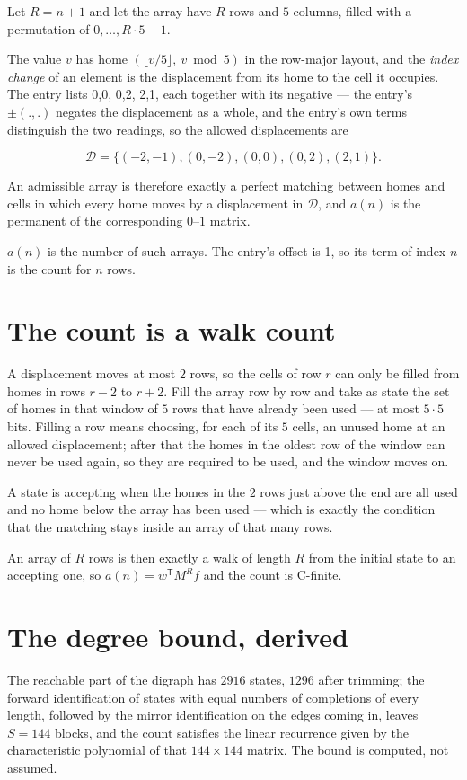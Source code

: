 \documentclass[11pt]{article}
\theoremstyle{definition}
\begin{document}
Let $R = n + 1$ and let the array have $R$ rows and $5$ columns, filled with a permutation of $0,\dots,R\cdot5-1$.

The value $v$ has home $(\lfloor v/5\rfloor,\ v \bmod 5)$ in the row-major layout, and the {\itshape index change} of an element is the displacement from its home to the cell it occupies. The entry lists 0,0, 0,2, 2,1, each together with its negative --- the entry's $\pm(.,.)$ negates the displacement as a whole, and the entry's own terms distinguish the two readings, so the allowed displacements are

\[\mathcal{D} = \{(-2,-1), (0,-2), (0,0), (0,2), (2,1)\}.\]

An admissible array is therefore exactly a perfect matching between homes and cells in which every home moves by a displacement in $\mathcal{D}$, and $a(n)$ is the permanent of the corresponding $0$--$1$ matrix.

$a(n)$ is the number of such arrays. The entry's offset is 1, so its term of index $n$ is the count for $n$ rows.

\section{The count is a walk count}

A displacement moves at most $2$ rows, so the cells of row $r$ can only be filled from homes in rows $r-2$ to $r+2$. Fill the array row by row and take as state the set of homes in that window of $5$ rows that have already been used --- at most $5\cdot5$ bits. Filling a row means choosing, for each of its $5$ cells, an unused home at an allowed displacement; after that the homes in the oldest row of the window can never be used again, so they are required to be used, and the window moves on.

A state is accepting when the homes in the $2$ rows just above the end are all used and no home below the array has been used --- which is exactly the condition that the matching stays inside an array of that many rows.

An array of $R$ rows is then exactly a walk of length $R$ from the initial state to an accepting one, so $a(n) = w^{\mathsf T}M^{R}f$ and the count is C-finite.

\section{The degree bound, derived}

The reachable part of the digraph has $2916$ states, $1296$ after trimming; the forward identification of states with equal numbers of completions of every length, followed by the mirror identification on the edges coming in, leaves $S = 144$ blocks, and the count satisfies the linear recurrence given by the characteristic polynomial of that $144\times144$ matrix. The bound is computed, not assumed.
\end{document}
